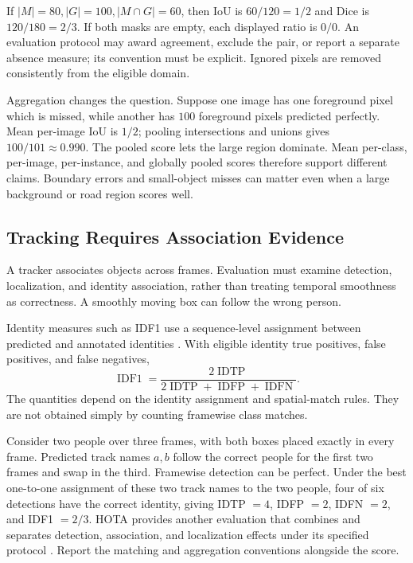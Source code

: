 If $|M|=80,|G|=100,|M\cap G|=60$, then IoU is $60/120=1/2$ and Dice is $120/180=2/3$. If both masks are empty, each displayed ratio is $0/0$. An evaluation protocol may award agreement, exclude the pair, or report a separate absence measure; its convention must be explicit. Ignored pixels are removed consistently from the eligible domain.

Aggregation changes the question. Suppose one image has one foreground pixel which is missed, while another has $100$ foreground pixels predicted perfectly. Mean per-image IoU is $1/2$; pooling intersections and unions gives $100/101\approx0.990$. The pooled score lets the large region dominate. Mean per-class, per-image, per-instance, and globally pooled scores therefore support different claims. Boundary errors and small-object misses can matter even when a large background or road region scores well.

\subsection{Tracking Requires Association Evidence}

A tracker associates objects across frames. Evaluation must examine detection, localization, and identity association, rather than treating temporal smoothness as correctness. A smoothly moving box can follow the wrong person.

Identity measures such as IDF1 use a sequence-level assignment between predicted and annotated identities \citep{ristani2016tracking}. With eligible identity true positives, false positives, and false negatives,
\[
\operatorname{IDF1}=\frac{2\operatorname{IDTP}}{2\operatorname{IDTP}+\operatorname{IDFP}+\operatorname{IDFN}}.
\]
The quantities depend on the identity assignment and spatial-match rules. They are not obtained simply by counting framewise class matches.

Consider two people over three frames, with both boxes placed exactly in every frame. Predicted track names $a,b$ follow the correct people for the first two frames and swap in the third. Framewise detection can be perfect. Under the best one-to-one assignment of these two track names to the two people, four of six detections have the correct identity, giving IDTP $=4$, IDFP $=2$, IDFN $=2$, and IDF1 $=2/3$. HOTA provides another evaluation that combines and separates detection, association, and localization effects under its specified protocol \citep{luiten2021hota}. Report the matching and aggregation conventions alongside the score.

